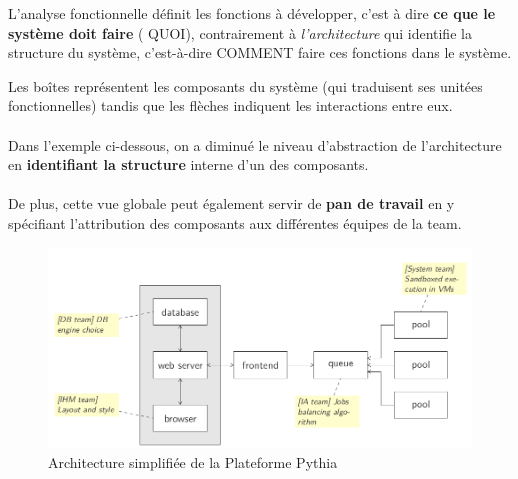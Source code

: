 \item{}
{\faux}
{L'analyse fonctionnelle} définit les fonctions à développer, c'est à dire \textbf{ce que le système doit faire} ( QUOI), contrairement à \textit{l'architecture} qui identifie la structure du système, c'est-à-dire COMMENT faire ces fonctions dans le système.


\item{}
{\vrai}
{}


\item{}
{\vrai}
{Les boîtes représentent les composants du système (qui traduisent ses unitées fonctionnelles) tandis que les flèches indiquent les interactions entre eux.
\paragraph{}
Dans l'exemple ci-dessous, on a diminué le niveau d'abstraction de l'architecture en \textbf{identifiant la structure} interne d'un des composants.
\paragraph{}
De plus, cette vue globale peut également servir de \textbf{pan de travail} en y spécifiant l'attribution des composants aux différentes équipes de la team.

\begin{figure}[h!]
\center
\includegraphics[scale=.4]{images/architecture-schema}
\caption{Architecture simplifiée de la Plateforme Pythia \cite{ref7}}
\end{figure}}


